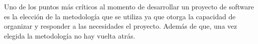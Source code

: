 Uno de los puntos más críticos al momento de desarrollar un proyecto de software es la elección de la metodología que se utiliza ya que otorga la capacidad de organizar y responder a las necesidades el proyecto. Además de que, una vez elegida la metodología no hay vuelta atrás.
